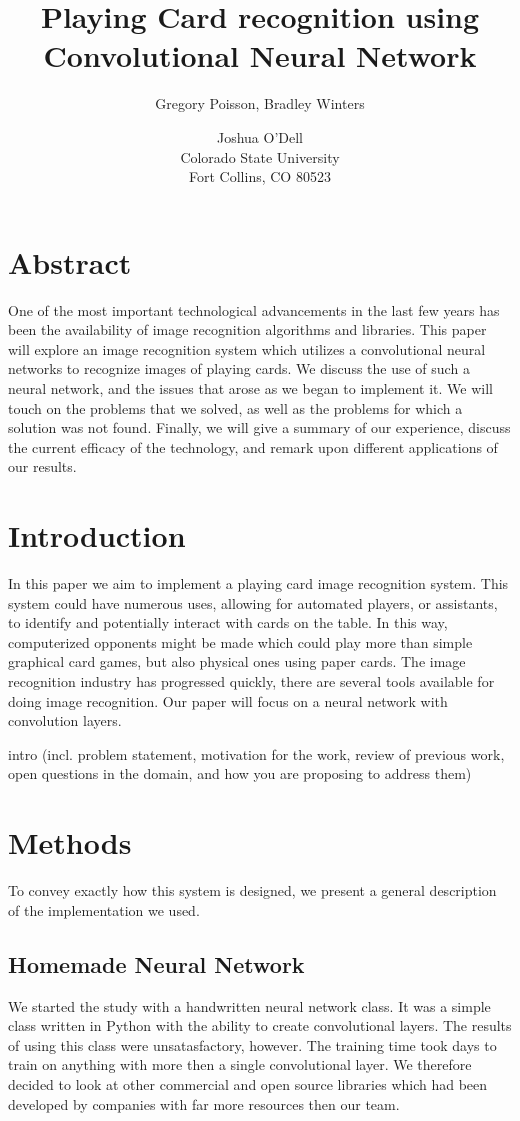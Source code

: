 \documentclass[letterpaper]{article}
\title{Playing Card recognition using Convolutional Neural Network}
\author{Gregory Poisson, Bradley Winters \and Joshua O'Dell \\ Colorado State University \\ Fort Collins, CO 80523 }
\begin{document}
\maketitle

\section{Abstract}

One of the most important technological advancements in the last few years has been the availability of image recognition algorithms and libraries.  This paper will explore an image recognition system which utilizes a convolutional neural networks to recognize images of playing cards. We discuss the use of such a neural network, and the issues that arose as we began to implement it.  We will touch on the problems that we solved, as well as the problems for which a solution was not found.  Finally, we will give a summary of our experience, discuss the current efficacy of the technology, and remark upon different applications of our results.

\section{Introduction}

In this paper we aim to implement a playing card image recognition system.  This system could have numerous uses, allowing for automated players, or assistants, to identify and potentially interact with cards on the table. In this way, computerized opponents might be made which could play more than simple graphical card games, but also physical ones using paper cards.
The image recognition industry has progressed quickly, there are several tools available for doing image recognition.  Our paper will focus on a neural network with convolution layers.

intro (incl. problem statement, motivation for the work, review of previous work, open questions in the domain, and how you are proposing to address them)

\section{Methods}
To convey exactly how this system is designed, we present a general description of the implementation we used.

\subsection{Homemade Neural Network}
We started the study with a handwritten neural network class.  It was a simple class written in Python with the ability to create convolutional layers.  The results of using this class were unsatasfactory, however.  The training time took days to train on anything with more then a single convolutional layer.  We therefore decided to look at other commercial and open source libraries which had been developed by companies with far more resources then our team.
\end{document}
